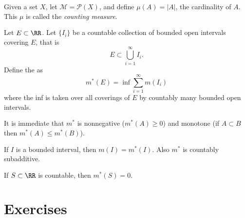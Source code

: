 \begin{example}
Given a set $X$, let $\mathcal{M}=\mathcal{P}(X)$, and define $\mu(A)=|A|$, the cardinality of $A$. This $\mu$ is called the \emph{counting measure}.
\end{example}



\begin{definition}
Let $E\subset\RR$. Let $\{I_i\}$ be a countable collection of bounded open intervals covering $E$, that is
\[E\subset\bigcup_{i=1}^{\infty}I_i.\]
Define the  as
\[m^*(E)=\inf\sum_{i=1}^{\infty}m(I_i)\]
where the inf is taken over all coverings of $E$ by countably many bounded open intervals.
\end{definition}

It is immediate that $m^*$ is nonnegative ($m^*(A)\ge0$) and monotone (if $A\subset B$ then $m^*(A)\le m^*(B)$).

\begin{proposition}
If $I$ is a bounded interval, then $m(I)=m^*(I)$. Also $m^*$ is countably subadditive.
\end{proposition}

\begin{corollary}
If $S\subset\RR$ is countable, then $m^*(S)=0$.
\end{corollary}
\pagebreak

\section*{Exercises}
